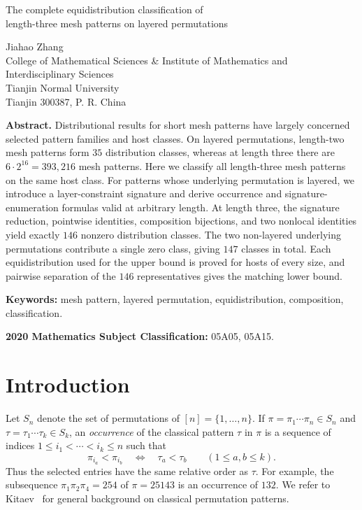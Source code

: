 \documentclass[12pt]{article}
\begin{document}
\begin{center}
{\large The complete equidistribution classification of\\
length-three mesh patterns on layered permutations}
\end{center}

\begin{center}
{\large Jiahao Zhang}\\[10pt]
College of Mathematical Sciences \& Institute of Mathematics and
Interdisciplinary Sciences\\
Tianjin Normal University\\
Tianjin 300387, P. R. China
\end{center}

\noindent\textbf{Abstract.}
Distributional results for short mesh patterns have largely concerned selected
pattern families and host classes.  On layered permutations, length-two mesh
patterns form $35$ distribution classes, whereas at length three there are
$6\cdot2^{16}=393{,}216$ mesh patterns.  Here we classify all length-three
mesh patterns on the same host class.  For patterns whose underlying
permutation is
layered, we introduce a layer-constraint signature and derive occurrence and
signature-enumeration formulas valid at arbitrary length.  At length three,
the signature reduction, pointwise identities, composition bijections, and
two nonlocal identities yield exactly $146$ nonzero distribution classes.
The two non-layered underlying permutations contribute a single zero class,
giving $147$ classes in total.  Each equidistribution used for the upper bound
is proved for hosts of every size, and pairwise separation of the $146$
representatives gives the matching lower bound.

\par\smallskip\noindent\textbf{Keywords:} mesh pattern, layered permutation,
equidistribution, composition, classification.

\par\smallskip\noindent\textbf{2020 Mathematics Subject Classification:}
05A05, 05A15.

\section{Introduction}

Let $S_n$ denote the set of permutations of $[n]=\{1,\ldots,n\}$.  If
$\pi=\pi_1\cdots\pi_n\in S_n$ and $\tau=\tau_1\cdots\tau_k\in S_k$, an
\emph{occurrence} of the classical pattern $\tau$ in $\pi$ is a sequence of
indices $1\le i_1<\cdots<i_k\le n$ such that
\[
\pi_{i_a}<\pi_{i_b}
\quad\Longleftrightarrow\quad
\tau_a<\tau_b
\qquad(1\le a,b\le k).
\]
Thus the selected entries have the same relative order as $\tau$.  For
example, the subsequence $\pi_1\pi_2\pi_4=254$ of $\pi=25143$ is an occurrence
of $132$.  We refer to Kitaev~\cite{KitaevBook} for general background on
classical permutation patterns.
\end{document}
